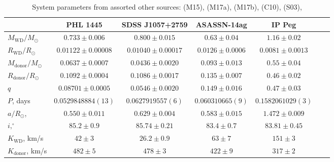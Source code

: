 \begin{landscape}
        \begin{table}
            \centering
            \caption{System parameters from assorted other sources: \citet{mcallister2015} (M15), \citet{mcallister2017} (M17a), \citet{mcallister2017b} (M17b), \citet{copperwheat2010} (C10), \citet{shafter2003} (S03), }
            \label{table:supplementary systems}
            \begin{tabular}{lcccccc}
                \hline
                ~                           & \textbf{PHL 1445}         & \textbf{SDSS J1057+2759}  & \textbf{ASASSN-14ag}  & \textbf{IP Peg}       \\
                \hline \hline
                $M_\mathrm{WD}/M_\odot$     & $0.733\pm0.006$           & $0.800\pm0.015$           & $0.63\pm0.04$         & $1.16\pm0.02$         \\
                $R_\mathrm{WD}/R_\odot$     & $0.01122\pm0.00008$       & $0.01040\pm0.00017$       & $0.0126\pm0.0006$     & $0.0081\pm0.0013$     \\
                $M_\mathrm{donor}/M_\odot$  & $0.0637\pm0.0007$         & $0.0436\pm0.0020$         & $0.093\pm0.013$       & $0.55\pm0.04$         \\
                $R_\mathrm{donor}/R_\odot$  & $0.1092\pm0.0004$         & $0.1086\pm0.0017$         & $0.135\pm0.007$       & $0.46\pm0.02$         \\
                $q$                         & $0.08701\pm0.0005$        & $0.0546\pm0.0020$         & $0.149\pm0.016$       & $0.47\pm0.03$         \\
                \hline
                $P$, days                   & $0.0529848884(13)$        & $0.0627919557(6)$         & $0.060310665(9)$      & $0.1582061029(3)$     \\
                $a/R_\odot$,                & $0.550\pm0.011$           & $0.629\pm0.004$           & $0.583\pm0.015$       & $1.472\pm0.009$       \\
                $i, ^\circ$                 & $85.2\pm0.9$              & $85.74\pm0.21$            & $83.4\pm0.7$          & $83.81\pm0.45$        \\
                $K_\mathrm{WD}$, km/s       & $42\pm3$                  & $26.2\pm0.9$              & $63\pm7$              & $151\pm3$             \\
                $K_\mathrm{donor}$, km/s    & $482\pm5$                 & $478\pm3$                 & $422\pm9$             & $317\pm2$             \\

\end{tabular}
\end{table}
\end{landscape}
